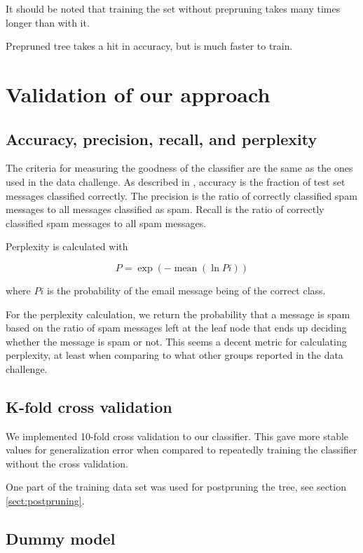 \documentclass[a4paper,10pt]{article}
\begin{document}
It should be noted that training the set without prepruning takes many
times longer than with it.

Prepruned tree takes a hit in accuracy, but is much faster to train.

\section{Validation of our approach}

\subsection{Accuracy, precision, recall, and perplexity}

The criteria for measuring the goodness of the classifier are the same
as the ones used in the data challenge.  As described in
\cite{termproject}, accuracy is the fraction of test set messages
classified correctly.  The precision is the ratio of correctly
classified spam messages to all messages classified as spam.  Recall is
the ratio of correctly classified spam messages to all spam messages.

Perplexity is calculated with

\begin{equation}
P = \exp(-\operatorname{mean}(\ln{Pi}))
\end{equation}

where $Pi$ is the probability of the email message being of the correct
class.

For the perplexity calculation, we return the probability that a message
is spam based on the ratio of spam messages left at the leaf node that
ends up deciding whether the message is spam or not.  This seems a
decent metric for calculating perplexity, at least when comparing to
what other groups reported in the data challenge.

\subsection{K-fold cross validation}

We implemented 10-fold cross validation to our classifier.  This
gave more stable values for generalization error when compared to
repeatedly training the classifier without the cross validation.

One part of the training data set was used for postpruning the tree, see
section \ref{sect:postpruning}.

\subsection{Dummy model}
\end{document}
